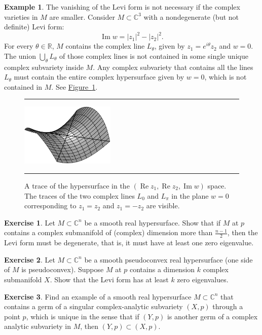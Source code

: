 \documentclass[12pt,openany]{book}
\renewcommand{\Re}{\operatorname{Re}}
\renewcommand{\Im}{\operatorname{Im}}
\newcommand{\abs}[1]{\left\lvert {#1} \right\rvert}
\newcommand{\C}{{\mathbb{C}}}
\newcommand{\R}{{\mathbb{R}}}
\theoremstyle{plain}
\theoremstyle{remark}
\theoremstyle{definition}
\newenvironment{exbox}{%
    \def\FrameCommand{\vrule width 1pt \relax\hspace{10pt}}%
    \MakeFramed{\advance\hsize-\width\FrameRestore}%
}{%
    \endMakeFramed
}
\newenvironment{myfig}{%
\begin{figure}[h!t]
\noindent\rule{\textwidth}{0.5pt}\vspace{12pt}\par\centering}%
{\par\noindent\rule{\textwidth}{0.5pt}
\end{figure}}
\theoremstyle{exercise}
\newtheorem{exercise}{Exercise}[section]
\theoremstyle{example}
\newtheorem{example}[thm]{Example}
\newcommand{\figureref}[1]{\hyperref[#1]{Figure~\ref*{#1}}}
\begin{document}
\begin{example}
The vanishing of the Levi form is not necessary if the complex varieties in
$M$ are smaller.  Consider $M\subset \C^3$ with a nondegenerate (but not definite)
Levi form:
\begin{equation*}
\Im w = \abs{z_1}^2-\abs{z_2}^2 .
\end{equation*}
For every $\theta \in \R$,
$M$ contains the complex line $L_\theta$,
given by $z_1 = e^{i\theta} z_2$ and
$w = 0$.  The union $\bigcup_\theta L_\theta$ of those
complex lines is not
contained in some single unique complex subvariety inside $M$.  Any complex
subvariety that contains all the lines $L_\theta$ must contain the entire complex hypersurface given
by $w = 0$, which is not contained in $M$.
See \figureref{fig:hyperquadgraph}.

\begin{myfig}
\includegraphics[width=0.4\textwidth]{figures/hyperquadgraph.pdf}
\caption{A trace of the hypersurface in the $(\Re z_1,\Re z_2,\Im w)$
space.  The traces of the two complex lines $L_0$ and $L_{\pi}$ in the plane
$w=0$ corresponding to 
$z_1=z_2$ and $z_1=-z_2$ are visible.\label{fig:hyperquadgraph}}
\end{myfig}
\end{example}

\begin{exbox}
\begin{exercise}
Let $M \subset \C^n$ be a smooth real hypersurface.
Show that if $M$ at $p$ contains a complex submanifold of (complex)
dimension more than
$\frac{n-1}{2}$, then the Levi form must be degenerate, that is, it must
have at least one zero eigenvalue.
\end{exercise}

\begin{exercise}
Let $M \subset \C^n$ be a smooth pseudoconvex real hypersurface
(one side of $M$ is pseudoconvex).
Suppose $M$ at $p$ contains a dimension $k$ complex submanifold $X$.
Show that the Levi form has at least $k$ zero eigenvalues.
\end{exercise}

\begin{exercise}
Find an example of a smooth real hypersurface $M \subset \C^n$ that contains a
germ of a singular complex-analytic subvariety $(X,p)$ through a point $p$,
which is unique in the sense that if $(Y,p)$ is another germ of a complex
analytic subvariety in $M$, then $(Y,p) \subset (X,p)$.
\end{exercise}
\end{exbox}
\end{document}
